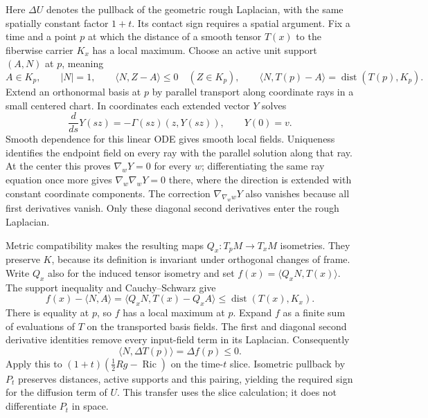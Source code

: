 Here $\Delta U$ denotes the pullback of the geometric rough
Laplacian, with the same spatially constant factor $1+t$.
Its contact sign requires a spatial argument.  Fix a time and a
point $p$ at which the distance of a smooth tensor $T(x)$ to the
fiberwise carrier $K_x$ has a local maximum.  Choose an active unit
support $(A,N)$ at $p$, meaning
\[
 A\in K_p,\qquad |N|=1,\qquad
 \langle N,Z-A\rangle\leq0\quad(Z\in K_p),\qquad
 \langle N,T(p)-A\rangle=\operatorname{dist}(T(p),K_p).
\]
Extend an orthonormal basis at $p$ by parallel transport along
coordinate rays in a small centered chart.  In coordinates each
extended vector $Y$ solves
\[
 \frac{d}{ds}Y(sz)=-\Gamma(sz)(z,Y(sz)),\qquad Y(0)=v.
\]
Smooth dependence for this linear ODE gives smooth local fields.
Uniqueness identifies the endpoint field on every ray with the
parallel solution along that ray.  At the center this proves
$\nabla_wY=0$ for every $w$; differentiating the same ray equation
once more gives $\nabla_w\nabla_wY=0$ there, where the direction
is extended with constant coordinate components.  The correction
$\nabla_{\nabla_ww}Y$ also vanishes because all first derivatives
vanish.  Only these diagonal second derivatives enter the rough
Laplacian.

Metric compatibility makes the resulting maps $Q_x:T_pM\to T_xM$
isometries.  They preserve $K$, because its definition is invariant
under orthogonal changes of frame.  Write $Q_x$ also for the induced
tensor isometry and set $f(x)=\langle Q_xN,T(x)\rangle$.
The support inequality and Cauchy--Schwarz give
\[
 f(x)-\langle N,A\rangle
   =\langle Q_xN,T(x)-Q_xA\rangle
   \leq\operatorname{dist}(T(x),K_x).
\]
There is equality at $p$, so $f$ has a local maximum at $p$.
Expand $f$ as a finite sum of evaluations of $T$ on the transported
basis fields.  The first and diagonal second derivative identities
remove every input-field term in its Laplacian.  Consequently
\[
 \langle N,\Delta T(p)\rangle=\Delta f(p)\leq0.
\]
Apply this to $(1+t)(\tfrac12Rg-\operatorname{Ric})$ on the
time-$t$ slice.  Isometric pullback by $P_t$ preserves distances,
active supports and this pairing, yielding the required sign for
the diffusion term of $U$.  This transfer uses the slice calculation;
it does not differentiate $P_t$ in space.

